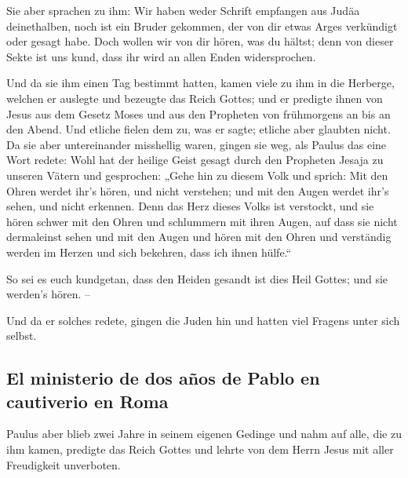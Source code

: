 Sie aber sprachen zu ihm: Wir haben weder Schrift
empfangen aus Judäa deinethalben, noch ist ein Bruder gekommen, der von
dir etwas Arges verkündigt oder gesagt habe.  Doch wollen
wir von dir hören, was du hältst; denn von dieser Sekte ist uns kund,
dass ihr wird an allen Enden widersprochen.

 Und da sie ihm einen Tag bestimmt hatten, kamen viele zu
ihm in die Herberge, welchen er auslegte und bezeugte das Reich Gottes;
und er predigte ihnen von Jesus aus dem Gesetz Moses und aus den
Propheten von frühmorgens an bis an den Abend.  Und
etliche fielen dem zu, was er sagte; etliche aber glaubten nicht.
 Da sie aber untereinander misshellig waren, gingen sie
weg, als Paulus das eine Wort redete: Wohl hat der heilige Geist gesagt
durch den Propheten Jesaja zu unseren Vätern  und
gesprochen: „Gehe hin zu diesem Volk und sprich: Mit den Ohren werdet
ihr's hören, und nicht verstehen; und mit den Augen werdet ihr's sehen,
und nicht erkennen.  Denn das Herz dieses Volks ist
verstockt, und sie hören schwer mit den Ohren und schlummern mit ihren
Augen, auf dass sie nicht dermaleinst sehen und mit den Augen und hören
mit den Ohren und verständig werden im Herzen und sich bekehren, dass
ich ihnen hülfe.``

 So sei es euch kundgetan, dass den Heiden gesandt ist
dies Heil Gottes; und sie werden's hören. --

 Und da er solches redete, gingen die Juden hin und
hatten viel Fragens unter sich selbst.

\hypertarget{el-ministerio-de-dos-auxf1os-de-pablo-en-cautiverio-en-roma}{%
\subsection{El ministerio de dos años de Pablo en cautiverio en
Roma}\label{el-ministerio-de-dos-auxf1os-de-pablo-en-cautiverio-en-roma}}

 Paulus aber blieb zwei Jahre in seinem eigenen Gedinge
und nahm auf alle, die zu ihm kamen,  predigte das Reich
Gottes und lehrte von dem Herrn Jesus mit aller Freudigkeit unverboten.
